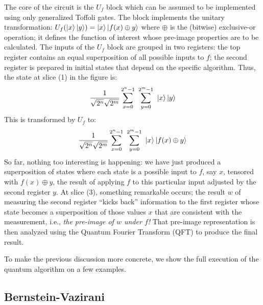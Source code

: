 \documentclass{article}
\begin{document}
The core of the circuit is the $U_f$ block which can be assumed to be
implemented using only generalized Toffoli gates. The block implements
the unitary transformation: $U_f(\ket{x}\ket{y}) = \ket{x}\ket{f(x)
  \oplus y}$ where $\oplus$ is the (bitwise) exclusive-or operation;
it defines the function of interest whose pre-image properties are to
be calculated. The inputs of the $U_f$ block are grouped in two
registers: the top register contains an equal superposition of all
possible inputs to $f$; the second register is prepared in initial
states that depend on the specific algorithm. Thus, the state at slice
(1) in the figure is:
  \[
  \frac{1}{\sqrt{2^n}\sqrt{2^m}}\sum_{x=0}^{2^n-1} ~\sum_{y=0}^{2^m-1} ~\ket{x}\ket{y}
  \]
This is transformed by $U_f$ to:
  \[
  \frac{1}{\sqrt{2^n}\sqrt{2^m}}
  \sum_{x=0}^{2^n-1} ~\sum_{y=0}^{2^m-1} ~\ket{x}\ket{f(x)\oplus y}
  \]
So far, nothing too interesting is happening: we have just produced a
superposition of states where each state is a possible input to $f$,
say $x$, tensored with $f(x) \oplus y$, the result of applying $f$ to
this particular input adjusted by the second register $y$. At slice
(3), something remarkable occurs; the result $w$ of measuring the
second register ``kicks back'' information to the first register whose
state becomes a superposition of those values $x$ that are consistent
with the measurement, i.e., \emph{the pre-image of $w$ under $f$!}
That pre-image representation is then analyzed using the Quantum
Fourier Transform (QFT) to produce the final result.

To make the previous discussion more concrete, we show the full
execution of the quantum algorithm on a few examples.

\subsection{Bernstein-Vazirani}
\end{document}

